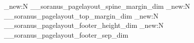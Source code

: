 %
%
%
% 
%


%

\dim_new:N \g__soranus_pagelayout_spine_margin_dim
\dim_new:N \g__soranus_pagelayout_top_margin_dim
\dim_new:N \g__soranus_pagelayout_footer_height_dim
\dim_new:N \g__soranus_pagelayout_footer_sep_dim



